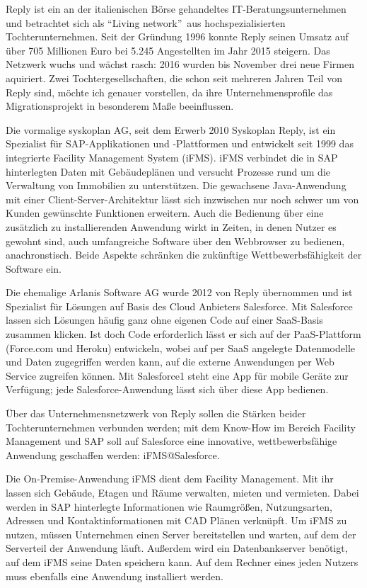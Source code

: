 

Reply ist ein an der italienischen Börse gehandeltes 
IT-Beratungsunternehmen und betrachtet sich als "`Living network"'\ aus 
hochspezialisierten Tochterunternehmen. Seit der Gründung 1996 konnte Reply 
seinen Umsatz auf über 705 Millionen Euro bei 5.245 Angestellten im Jahr 2015 
steigern. Das Netzwerk wuchs und wächst rasch: 2016 wurden bis November drei 
neue Firmen aquiriert. Zwei Tochtergesellschaften, die schon seit mehreren 
Jahren Teil von Reply sind, 
möchte ich genauer vorstellen, da ihre Unternehmensprofile das 
Migrationsprojekt in besonderem Maße beeinflussen.

Die vormalige syskoplan AG, seit dem Erwerb 2010  
Syskoplan Reply, ist ein Spezialist für SAP-Applikationen und 
-Plattformen  und entwickelt seit 1999 das 
integrierte Facility Management System (iFMS). iFMS verbindet die in SAP 
hinterlegten Daten mit Gebäudeplänen und versucht Prozesse rund um die 
Verwaltung von Immobilien zu unterstützen. Die gewachsene 
Java-Anwendung mit einer Client-Server-Architektur lässt sich inzwischen nur 
noch schwer um von Kunden gewünschte Funktionen erweitern. Auch die Bedienung 
über 
eine zusätzlich zu installierenden Anwendung wirkt in Zeiten, in denen Nutzer 
es gewohnt sind, auch umfangreiche Software über den Webbrowser zu bedienen, 
anachronstisch. Beide Aspekte schränken die zukünftige
Wettbewerbsfähigkeit der Software ein. 

Die ehemalige Arlanis Software AG wurde 2012 von Reply übernommen und ist 
Spezialist für Lösungen auf Basis des Cloud Anbieters Salesforce. Mit 
Salesforce lassen sich Lösungen häufig ganz ohne eigenen Code auf einer 
SaaS-Basis zusammen klicken. Ist doch Code erforderlich lässt er sich auf der 
PaaS-Plattform (Force.com und Heroku) entwickeln, wobei auf per SaaS angelegte 
Datenmodelle und Daten zugegriffen werden kann, auf die externe Anwendungen per 
Web Service zugreifen können. Mit Salesforce1 steht eine App für mobile Geräte 
zur Verfügung; jede Salesforce-Anwendung lässt sich über diese App bedienen. 

Über das Unternehmensnetzwerk von Reply sollen die Stärken beider 
Tochterunternehmen verbunden werden; mit dem Know-How im Bereich Facility 
Management und SAP soll auf Salesforce eine innovative, wettbewerbsfähige 
Anwendung geschaffen werden: iFMS@Salesforce.

Die On-Premise-Anwendung iFMS dient dem Facility Management. Mit ihr lassen 
sich Gebäude, Etagen und Räume verwalten, mieten und vermieten. Dabei werden in 
SAP hinterlegte Informationen wie Raumgrößen, Nutzungsarten, Adressen und 
Kontaktinformationen mit CAD Plänen verknüpft. Um iFMS zu nutzen, müssen 
Unternehmen einen Server bereitstellen und warten, auf dem der Serverteil der 
Anwendung läuft. Außerdem wird ein Datenbankserver benötigt, auf dem iFMS seine 
Daten speichern kann. Auf dem Rechner eines jeden Nutzers muss ebenfalls eine 
Anwendung installiert werden. 

